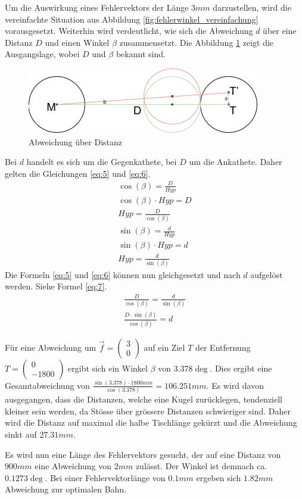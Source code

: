 Um die Auswirkung eines Fehlervektors der Länge $3mm$ darzustellen, wird die vereinfachte Situation aus Abbildung
\ref{fig:fehlerwinkel_vereinfachung} vorausgesetzt. Weiterhin wird verdeutlicht, wie sich die Abweichung $d$ über eine
Distanz $D$ und einen Winkel $\beta$ zusammensetzt. Die Abbildung \ref{fig:abweichung_ueber_distanz} zeigt die Ausgangslage,
wobei $D$ und $\beta$ bekannt sind.
\begin{figure}[h!]
    \begin{center}
        \includegraphics[width=0.4\linewidth]{../common/07_appendix/resources/04_abweichung.png}
    \end{center}
    \caption{Abweichung über Distanz}
    \label{fig:abweichung_ueber_distanz}
\end{figure}
Bei $d$ handelt es sich um die Gegenkathete, bei $D$ um die Ankathete. Daher gelten die Gleichungen \ref{eq:5} und \ref{eq:6}.
\begin{align}
    \cos(\beta) = \frac{D}{Hyp}\\
    \cos(\beta) \cdot Hyp = D\\
    Hyp = \frac{D}{\cos(\beta)}\label{eq:5}\\
    \sin(\beta) = \frac{d}{Hyp}\\
    \sin(\beta) \cdot Hyp = d\\
    Hyp = \frac{d}{\sin(\beta)}\label{eq:6}
\end{align}
Die Formeln \ref{eq:5} und \ref{eq:6} können nun gleichgesetzt und nach $d$ aufgelöst werden. Siehe Formel \ref{eq:7}.
\begin{align}
    \frac{D}{\cos(\beta)} = \frac{d}{\sin(\beta)}\\
    \frac{D \cdot \sin(\beta)}{\cos(\beta)} = d\label{eq:7}
\end{align}

Für eine Abweichung um $\vec{f} = \begin{pmatrix}3\\0\end{pmatrix}$ auf ein Ziel $T$ der Entfernung $T = \begin{pmatrix}0\\-1800\end{pmatrix}$
ergibt sich ein Winkel $\beta$ von $3.378\deg$. Dies ergibt eine Gesamtabweichung von
$\frac{\sin(3.378) \cdot 1800mm}{\cos(3.378)} = 106.251mm$. Es wird davon ausgegangen, dass die Distanzen, welche eine
Kugel zurücklegen, tendenziell kleiner sein werden, da Stösse über grössere Distanzen schwieriger sind. Daher wird die Distanz
auf maximal die halbe Tischlänge gekürzt und die Abweichung sinkt auf $27.31mm$.

Es wird nun eine Länge des Fehlervektors gesucht, der auf eine Distanz von $900mm$ eine Abweichung von $2mm$ zulässt.
Der Winkel ist demnach ca. $0.1273\deg$. Bei einer Fehlervektorlänge von $0.1mm$ ergeben sich $1.82mm$ Abweichung zur
optimalen Bahn.